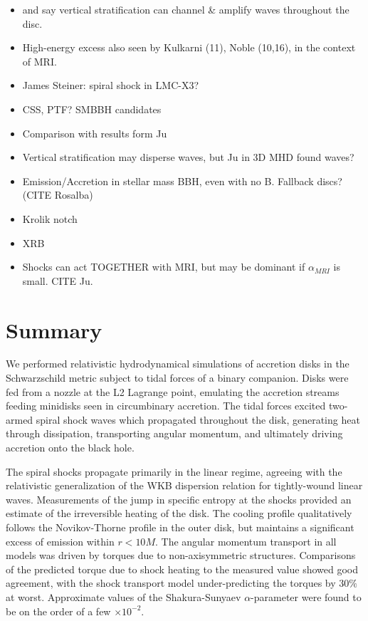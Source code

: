 \documentclass{emulateapj}
\newcommand{\al}{\alpha}
\begin{document}
\begin{itemize}
	\item \cite{Lubow98} and \cite{Ogilvie99} say vertical stratification can channel \& amplify waves throughout the disc.
	\item High-energy excess also seen by Kulkarni (11), Noble (10,16), in the context of MRI.  
	\item James Steiner: spiral shock in LMC-X3?
	\item CSS, PTF? SMBBH candidates
	\item Comparison with results form Ju
	\item Vertical stratification may disperse waves, but Ju in 3D MHD found waves?
	\item Emission/Accretion in stellar mass BBH, even with no B.  Fallback discs? (CITE Rosalba)
	\item Krolik notch
	\item XRB
	\item Shocks can act TOGETHER with MRI, but may be dominant if $\al_{MRI}$ is small.  CITE Ju.
\end{itemize}


\section{Summary}
\label{sec:summary}

We performed relativistic hydrodynamical simulations of accretion disks in the Schwarzschild metric subject to tidal forces of a binary companion.  Disks were fed from a nozzle at the L2 Lagrange point, emulating the accretion streams feeding minidisks seen in circumbinary accretion.  The tidal forces excited two-armed spiral shock waves which propagated throughout the disk,  generating heat through dissipation, transporting angular momentum, and ultimately driving accretion onto the black hole.

The spiral shocks propagate primarily in the linear regime, agreeing with the relativistic generalization of the WKB dispersion relation for tightly-wound linear waves.  Measurements of the jump in specific entropy at the shocks provided an estimate of the irreversible heating of the disk.  The cooling profile qualitatively follows the Novikov-Thorne profile in the outer disk, but maintains a significant excess of emission within $r < 10 M$.  The angular momentum transport in all models was driven by torques due to non-axisymmetric structures.  Comparisons of the predicted torque due to shock heating \citep{Rafikov16} to the measured value showed good agreement, with the shock transport model under-predicting the torques by $30\%$ at worst.  Approximate values of the Shakura-Sunyaev $\al$-parameter were found to be on the order of a few $\times 10^{-2}$.
\end{document}
